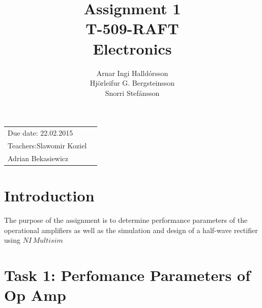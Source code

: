 \documentclass[11pt,a4paper]{article}
\title{Assignment 1 \\ T-509-RAFT \\ Electronics} %
\author{Arnar Ingi Halldórsson \\ Hjörleifur G. Bergsteinsson \\ Snorri Stefánsson} %
\begin{document}
\maketitle %

\begin{tabular}{lr}
Due date: 22.02.2015 \\
Teachers:\qquad Slawomir Koziel\\ %
\qquad \qquad \qquad Adrian Bekasiewicz
\end{tabular}

\setlength\parindent{0pt} %

\renewcommand{\labelenumi}{\alph{enumi}.} %

\section*{Introduction}

The purpose of the assignment is to determine performance parameters of the operational amplifiers as well as the simulation and design of a half-wave rectifier using $NI \, Multisim$

\section*{Task 1: Perfomance Parameters of Op Amp}
\end{document}
